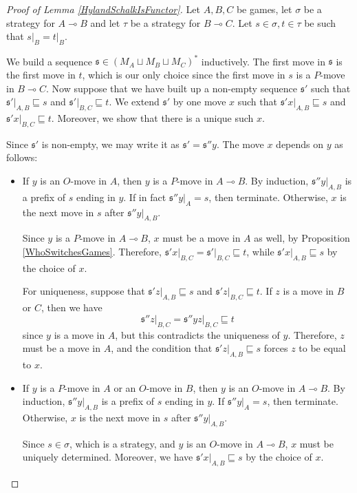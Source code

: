 \documentclass[11pt]{article} %
\theoremstyle{plain} %
\theoremstyle{definition} %
\theoremstyle{exercisestyle}
\renewcommand{\implies}{\multimap}
\newcommand{\cprd}{\sqcup}
\newcommand{\s}{\mathfrak s}
\newcommand{\prefix}{\sqsubseteq}
\begin{document}
\begin{proof}[Proof of Lemma \ref{HylandSchalkIsFunctor}]
  Let $A,B,C$ be games, let $\sigma$ be a strategy for $A\implies B$ and let $\tau$ be a strategy for $B\implies C$.  Let $s\in\sigma,t\in\tau$ be such that $s\vert_B=t\vert_B$.  

  We build a sequence $\s\in (M_A\cprd M_B\cprd M_C)^*$ inductively.  The first move in $\s$ is the first move in $t$, which is our only choice since the first move in $s$ is a $P$-move in $B\implies C$.  Now suppose that we have built up a non-empty sequence $\s'$ such that $\s'\vert_{A,B}\prefix s$ and $\s'\vert_{B,C}\prefix t$.  We extend $\s'$ by one move $x$ such that $\s'x\vert_{A,B}\prefix s$ and $\s'x\vert_{B,C}\prefix t$.  Moreover, we show that there is a unique such $x$.  

  Since $\s'$ is non-empty, we may write it as $\s'=\s''y$.  The move $x$ depends on $y$ as follows:
  \begin{itemize}
    \item If $y$ is an $O$-move in $A$, then $y$ is a $P$-move in $A\implies B$.  By induction, $\s''y\vert_{A,B}$ is a prefix of $s$ ending in $y$.  If in fact $\s''y\vert_A=s$, then terminate.  Otherwise, $x$ is the next move in $s$ after $\s''y\vert_{A,B}$.  
      
      Since $y$ is a $P$-move in $A\implies B$, $x$ must be a move in $A$ as well, by Proposition \ref{WhoSwitchesGames}.  Therefore, $\s'x\vert_{B,C}=\s'\vert_{B,C}\prefix t$, while $\s'x\vert_{A,B}\prefix s$ by the choice of $x$.  

      For uniqueness, suppose that $\s'z\vert_{A,B}\prefix s$ and $\s'z\vert_{B,C}\prefix t$.  If $z$ is a move in $B$ or $C$, then we have
      \[
        \s''z\vert_{B,C}=\s''yz\vert_{B,C}\prefix t
        \]
      since $y$ is a move in $A$, but this contradicts the uniqueness of $y$.  Therefore, $z$ must be a move in $A$, and the condition that $\s'z\vert_{A,B}\prefix s$ forces $z$ to be equal to $x$.  

    \item If $y$ is a $P$-move in $A$ or an $O$-move in $B$, then $y$ is an $O$-move in $A\implies B$.  By induction, $\s''y\vert_{A,B}$ is a prefix of $s$ ending in $y$.  If $\s''y\vert_A=s$, then terminate.  Otherwise, $x$ is the next move in $s$ after $\s''y\vert_{A,B}$.  

      Since $s\in\sigma$, which is a strategy, and $y$ is an $O$-move in $A\implies B$, $x$ must be uniquely determined.  Moreover, we have $\s'x\vert_{A,B}\prefix s$ by the choice of $x$.  
  \end{itemize}

\end{proof}


\end{document}
